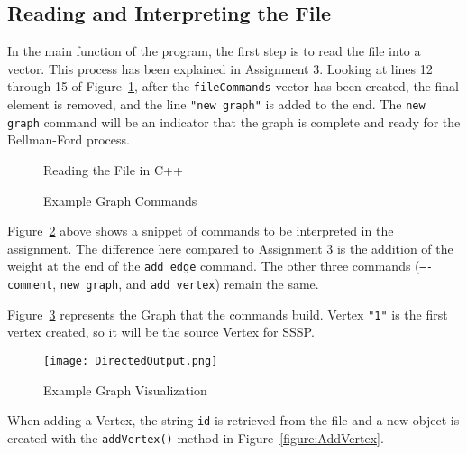 \documentclass[letterpaper, 10pt,DIV=13]{scrartcl}
\numberwithin{equation}{section} %
\numberwithin{figure}{section} %
\numberwithin{table}{section} %
\begin{document}
\subsection{Reading and Interpreting the File}
    
In the main function of the program, the first step is to read the file into a vector. This process has been explained in Assignment 3. Looking at lines 12 through 15 of Figure~\ref{figure:ReadFile}, after the \texttt{fileCommands} vector has been created, the final element is removed, and the line \texttt{"new graph"} is added to the end. The \texttt{new graph} command will be an indicator that the graph is complete and ready for the Bellman-Ford process.


\begin{figure}[ht] 
    \centering 
    
    \caption{Reading the File in C++}
    \label{figure:ReadFile}
\end{figure}




\pagebreak



\begin{figure}[ht] 
    \centering 
    
    \caption{Example Graph Commands}
    \label{figure:GraphsTXT}
\end{figure}

Figure~\ref{figure:GraphsTXT} above shows a snippet of commands to be interpreted in the assignment. The difference here compared to Assignment 3 is the addition of the weight at the end of the \texttt{add edge} command. The other three commands (\texttt{---- comment}, \texttt{new graph}, and \texttt{add vertex}) remain the same.

Figure~\ref{figure:DirectedOutput} represents the Graph that the commands build. Vertex \texttt{"1"} is the first vertex created, so it will be the source Vertex for SSSP.


\begin{figure}[h] 
    \centering 
    \texttt{[image: DirectedOutput.png]}
    \caption{Example Graph Visualization\footnotemark}
    \label{figure:DirectedOutput}
    
\end{figure}


When adding a Vertex, the string \texttt{id} is retrieved from the file and a new object is created with the \texttt{addVertex()} method in Figure~\ref{figure:AddVertex}.
\end{document}
